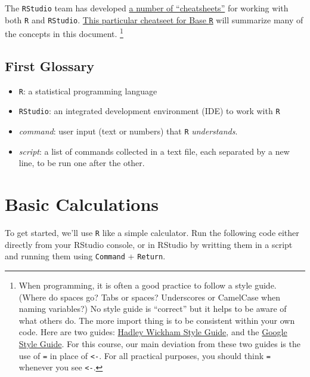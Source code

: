 \documentclass[]{book}
\providecommand{\tightlist}{%
  \setlength{\itemsep}{0pt}\setlength{\parskip}{0pt}}
\begin{document}
The \texttt{RStudio} team has developed \href{https://www.rstudio.com/resources/cheatsheets/}{a number of ``cheatsheets''} for working with both \texttt{R} and \texttt{RStudio}. \href{http://www.rstudio.com/wp-content/uploads/2016/05/base-r.pdf}{This particular cheatseet for Base \texttt{R}} will summarize many of the concepts in this document. \footnote{When programming, it is often a good practice to follow a style guide. (Where do spaces go? Tabs or spaces? Underscores or CamelCase when naming variables?) No style guide is ``correct'' but it helps to be aware of what others do. The more import thing is to be consistent within your own code. Here are two guides: \href{http://adv-r.had.co.nz/Style.html}{Hadley Wickham Style Guide}, and the \href{https://google.github.io/styleguide/Rguide.xml}{Google Style Guide}. For this course, our main deviation from these two guides is the use of \texttt{=} in place of \texttt{\textless{}-}. For all practical purposes, you should think \texttt{=} whenever you see \texttt{\textless{}-}.}

\hypertarget{first-glossary}{%
\subsection{First Glossary}\label{first-glossary}}

\begin{itemize}
\tightlist
\item
  \texttt{R}: a statistical programming language
\item
  \texttt{RStudio}: an integrated development environment (IDE) to work with \texttt{R}
\item
  \emph{command}: user input (text or numbers) that \texttt{R} \emph{understands}.
\item
  \emph{script}: a list of commands collected in a text file, each separated by a new line, to be run one after the other.
\end{itemize}

\hypertarget{basic-calculations}{%
\section{Basic Calculations}\label{basic-calculations}}

To get started, we'll use \texttt{R} like a simple calculator. Run the following code either directly from your RStudio console, or in RStudio by writting them in a script and running them using \texttt{Command} + \texttt{Return}.
\end{document}
